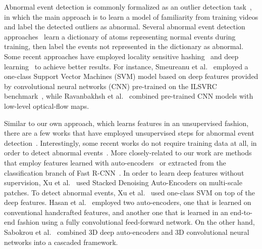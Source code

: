 \documentclass[10pt,twocolumn,letterpaper]{article}
\begin{document}
Abnormal event detection is commonly formalized as an outlier detection task~\cite{Antic-ICCV-2011,Cheng-CVPR-2015,Cong-CVPR-2011,Dutta-AAAI-2015,Ionescu-WACV-2019,Kim-CVPR-2009,Li-PAMI-2014,Lu-ICCV-2013,Mahadevan-CVPR-2010,Mehran-CVPR-2009,Ren-BMVC-2015,Xu-BMVC-2015,Xu-CVIU-2017,Zhang-PR-2016,Zhao-CVPR-2011}, in which the main approach is to learn a model of familiarity from training videos and label the detected outliers as abnormal. Several abnormal event detection approaches~\cite{Cheng-CVPR-2015,Cong-CVPR-2011,Dutta-AAAI-2015,Lu-ICCV-2013,Ren-BMVC-2015} learn a dictionary of atoms representing normal events during training, then label the events not represented in the dictionary as abnormal. Some recent approaches have employed locality sensitive hashing~\cite{Zhang-PR-2016} and deep learning~\cite{Hasan-CVPR-2016,Hinami-ICCV-2017,Liu-CVPR-2018,Luo-ICCV-2017,Ravanbakhsh-WACV-2018,Ravanbakhsh-ICIP-2017,Sabokrou-IP-2017,Smeureanu-ICIAP-2017,Xu-BMVC-2015,Xu-CVIU-2017} to achieve better results. For instance, Smeureanu et al.~\cite{Smeureanu-ICIAP-2017} employed a one-class Support Vector Machines (SVM) model based on deep features provided by convolutional neural networks (CNN) pre-trained on the ILSVRC benchmark~\cite{Russakovsky2015}, while Ravanbakhsh et al.~\cite{Ravanbakhsh-WACV-2018} combined pre-trained CNN models with low-level optical-flow maps. 

Similar to our own approach, which learns features in an unsupervised fashion, there are a few works that have employed unsupervised steps for abnormal event detection~\cite{Dutta-AAAI-2015,Hasan-CVPR-2016,Ren-BMVC-2015,Sabokrou-IP-2017,Xu-BMVC-2015,Xu-CVIU-2017}. Interestingly, some recent works do not require training data at all, in order to detect abnormal events~\cite{Giorno-ECCV-2016,Ionescu-ICCV-2017,Liu-BMVC-2018}. More closely-related to our work are methods that employ features learned with auto-encoders~\cite{Hasan-CVPR-2016,Sabokrou-IP-2017,Xu-BMVC-2015,Xu-CVIU-2017} or extracted from the classification branch of Fast R-CNN~\cite{Hinami-ICCV-2017}. In order to learn deep features without supervision, Xu et al.~\cite{Xu-BMVC-2015,Xu-CVIU-2017} used Stacked Denoising Auto-Encoders on multi-scale patches. To detect abnormal events, Xu et al.~\cite{Xu-BMVC-2015,Xu-CVIU-2017} used one-class SVM on top of the deep features. Hasan et al.~\cite{Hasan-CVPR-2016} employed two auto-encoders, one that is learned on conventional handcrafted features, and another one that is learned in an end-to-end fashion using a fully convolutional feed-forward network. On the other hand, Sabokrou et al.~\cite{Sabokrou-IP-2017} combined 3D deep auto-encoders and 3D convolutional neural networks into a cascaded framework.
\end{document}
